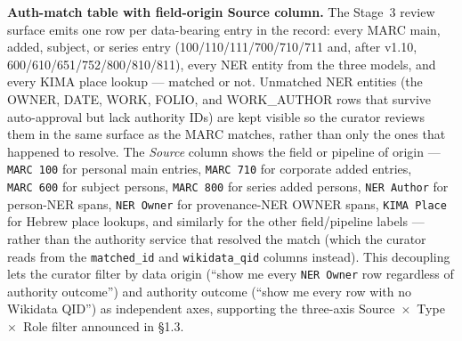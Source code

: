 \documentclass[Afour,sageh,times]{sagej}
\begin{document}
\textbf{Auth-match table with field-origin Source column.} The Stage~3 review surface emits one row per data-bearing entry in the record: every MARC main, added, subject, or series entry (100/110/111/700/710/711 and, after v1.10, 600/610/651/752/800/810/811), every NER entity from the three models, and every KIMA place lookup --- matched or not. Unmatched NER entities (the OWNER, DATE, WORK, FOLIO, and WORK\_AUTHOR rows that survive auto-approval but lack authority IDs) are kept visible so the curator reviews them in the same surface as the MARC matches, rather than only the ones that happened to resolve. The \emph{Source} column shows the field or pipeline of origin --- \texttt{MARC~100} for personal main entries, \texttt{MARC~710} for corporate added entries, \texttt{MARC~600} for subject persons, \texttt{MARC~800} for series added persons, \texttt{NER Author} for person-NER spans, \texttt{NER Owner} for provenance-NER OWNER spans, \texttt{KIMA Place} for Hebrew place lookups, and similarly for the other field/pipeline labels --- rather than the authority service that resolved the match (which the curator reads from the \texttt{matched\_id} and \texttt{wikidata\_qid} columns instead). This decoupling lets the curator filter by data origin (``show me every \texttt{NER Owner} row regardless of authority outcome'') and authority outcome (``show me every row with no Wikidata QID'') as independent axes, supporting the three-axis Source~$\times$~Type~$\times$~Role filter announced in §1.3.
\end{document}
